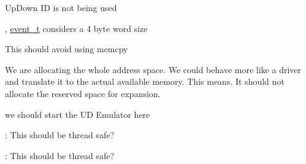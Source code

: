 
\begin{DoxyRefList}
\item[Class \mbox{\hyperlink{class_up_down_1_1event__t}{Up\+Down\+::event\+\_\+t}} ]\label{todo__todo000001}%
%
Up\+Down ID is not being used 



, \mbox{\hyperlink{class_up_down_1_1event__t}{event\+\_\+t}} considers a 4 byte word size  
\item[Member \mbox{\hyperlink{class_up_down_1_1operands__t_aef9a024a90d4073d82d1195cf82fa660}{Up\+Down\+::operands\+\_\+t\+::operands\+\_\+t}} (uint8\+\_\+t num, ptr\+\_\+t oper=nullptr, word\+\_\+t cont=0)]\label{todo__todo000002}%
%
This should avoid using memcpy  
\item[Member \mbox{\hyperlink{class_up_down_1_1_sim_u_d_runtime__t_a7113c0fad105b40a81231139332c0061}{Up\+Down\+::Sim\+UDRuntime\+\_\+t\+::init\+Memory\+Arrays}} ()]\label{todo__todo000005}%
%
We are allocating the whole address space. We could behave more like a driver and translate it to the actual available memory. This means. It should not allocate the reserved space for expansion.  
\item[Member \mbox{\hyperlink{class_up_down_1_1_sim_u_d_runtime__t_a4d07ad90b3cd6de2522c7e37ecdaf133}{Up\+Down\+::Sim\+UDRuntime\+\_\+t\+::start\+\_\+exec}} (uint8\+\_\+t ud\+\_\+id, uint8\+\_\+t lane\+\_\+num)]\label{todo__todo000006}%
%
we should start the UD Emulator here 
\item[Member \mbox{\hyperlink{class_up_down_1_1_u_d_runtime__t_aa02ee38bf2166f297f40176c88485c1a}{Up\+Down\+::UDRuntime\+\_\+t\+::mm\+\_\+free}} (void $\ast$ptr)]\label{todo__todo000004}%
%
\+: This should be thread safe? 
\item[Member \mbox{\hyperlink{class_up_down_1_1_u_d_runtime__t_a3f6d1895e3d1ad7fc40b918154a027ad}{Up\+Down\+::UDRuntime\+\_\+t\+::mm\+\_\+malloc}} (uint64\+\_\+t size)]\label{todo__todo000003}%
%
\+: This should be thread safe?
\end{DoxyRefList}